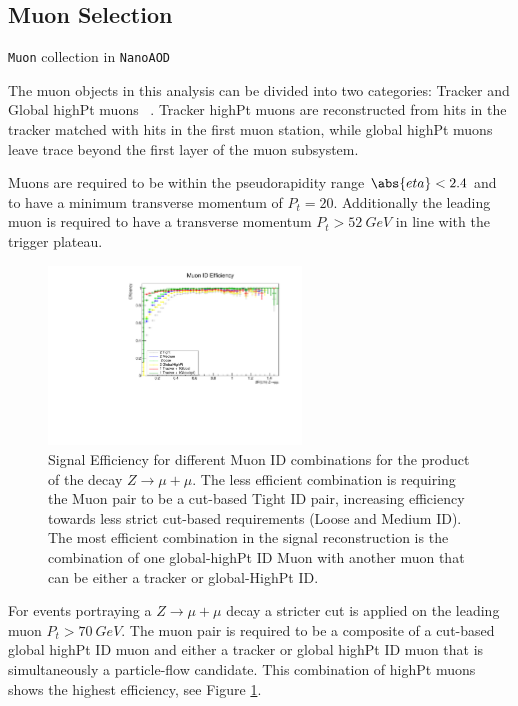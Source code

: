 \subsection{Muon Selection}

\verb|Muon| collection in \verb|NanoAOD|

The muon objects in this analysis can be divided into two categories:
Tracker and Global highPt muons ~\cite{MuonPOG}. Tracker highPt muons are
reconstructed from hits in the tracker matched with hits in the first
muon station, while global highPt muons leave trace beyond the first
layer of the muon subsystem.

Muons are required to be within the pseudorapidity range $\abs{eta}<2.4$ and
to have a minimum transverse momentum of $P_t=20$. Additionally the leading muon
is required to have a transverse momentum $P_t>52~GeV$ in line with
the trigger plateau.



\begin{figure}[tph]
  \centering
  \includegraphics[width=0.6\textwidth]{fig/LeptonIDStudies/MuonIDEfficiency.pdf}
  \caption{Signal Efficiency for different Muon ID combinations for the product of
    the decay $Z\rightarrow\mu+\mu$. The less efficient combination is requiring
    the Muon pair to be a cut-based Tight ID pair, increasing efficiency towards less
    strict cut-based requirements (Loose and Medium ID). The most efficient combination in
    the signal reconstruction is the combination of one global-highPt ID Muon
    with another muon that can be either a tracker or global-HighPt ID.}
  \label{fig:MuonIDEfficiency}
\end{figure}

For events portraying a $Z\rightarrow\mu+\mu$ decay a stricter cut is applied on the
leading muon $P_{t}>70~GeV$. The muon pair is required to be a composite of a
cut-based global highPt ID muon and either a tracker or global highPt ID muon
that is simultaneously a particle-flow candidate. This combination of highPt
muons shows the highest efficiency, see Figure \ref{fig:MuonIDEfficiency}.

